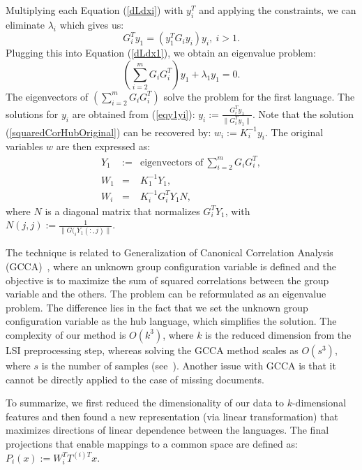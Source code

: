 Multiplying each Equation (\ref{dLdxi}) with $y_i^T$ and applying the
constraints, we can eliminate $\lambda_i$ which gives us:
\begin{equation}\label{eqy1yi}
G_{i}^T y_1 = \left(y_1^T G_{i} y_i \right) y_i,~i > 1.
\end{equation}
Plugging this into Equation (\ref{dLdx1}), we obtain an eigenvalue problem:
$$\left( \sum_{i = 2}^m G_i G_{i}^T \right) y_1 + \lambda_1 y_1 = 0.$$
The eigenvectors of $\left( \sum_{i = 2}^m G_i G_{i}^T \right)$ solve
the problem for the first language. The solutions for $y_i$ are obtained
from (\ref{eqy1yi}): $y_i := \frac{G_{i}^T y_1}{\| G_{i}^T y_1 \|}$.
Note that the solution (\ref{squaredCorHubOriginal}) can be recovered
by: $w_i := K_i^{-1} y_i$. The original variables $w$
are then expressed as:
\begin{eqnarray} 
Y_1 & := & \text{eigenvectors of}~\sum_{i = 2}^m G_i G_{i}^T,\\
W_1 &  = & K_1^{-1} Y_1,\\
W_i &  = & K_i^{-1} G_{i}^T Y_1 N,
\end{eqnarray}
where $N$ is a diagonal matrix that normalizes $G_{i}^T Y_1$, with
$N(j,j) := \frac{1}{\|G(_{i} Y_1(:,j)\|}$.

 The technique is related to  Generalization of Canonical
Correlation Analysis (GCCA)~\cite{Carroll}, where an unknown
group configuration variable is defined and the objective is to maximize the
sum of squared correlations between the group variable and the others. The
problem can be reformulated as an eigenvalue problem. The difference lies in
the fact that we set the unknown group configuration variable as the hub language,
which simplifies the solution. The complexity of our method is $O(k^3)$, where $k$
is the reduced dimension from the LSI preprocessing step, whereas solving the
GCCA method scales as $O(s^3)$, where $s$ is the number of samples (see~\cite{gifi}).
Another issue with GCCA is that it cannot be directly applied to the case of missing documents.

To summarize, we first reduced the dimensionality of our data to $k$-dimensional
features and then found a new representation (via linear transformation) that
maximizes directions of linear dependence between the languages. The final
projections that enable mappings to a common space are defined as:
$P_i(x) := W_i^T T^{(i)T} x.$

